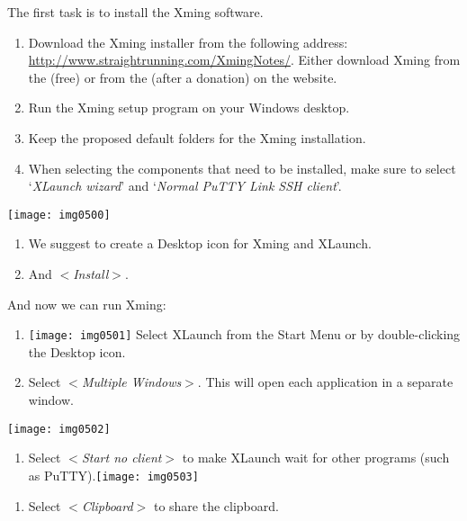 The first task is to install the Xming software.

\begin{enumerate}
  \item  Download the Xming installer from the following
    address: \url{http://www.straightrunning.com/XmingNotes/}. Either download Xming
    from the  (free) or from the  (after a donation) on the website.
  \item  Run the Xming setup program on your Windows desktop.
  \item  Keep the proposed default folders for the Xming installation.
  \item  When selecting the components that need to be installed, make sure to
    select `\emph{XLaunch wizard}' and `\emph{Normal PuTTY Link SSH client}'.
\end{enumerate}

\texttt{[image: img0500]}

\begin{enumerate}
\item  We suggest to create a Desktop icon for Xming and XLaunch.
\item  And $<$\textit{Install}$>$.
\end{enumerate}

And now we can run Xming:

\begin{enumerate}
\item  \texttt{[image: img0501]}  Select XLaunch from the Start Menu or by double-clicking the Desktop icon.
\item  Select $<$\textit{Multiple Windows}$>$. This will open each application in a separate window.
\end{enumerate}

\texttt{[image: img0502]}

\begin{enumerate}
\item  Select $<$\textit{Start no client}$>$ to make XLaunch wait for other programs (such as PuTTY).\texttt{[image: img0503]}
\end{enumerate}

\begin{enumerate}
\item  Select $<$\textit{Clipboard}$>$ to share the clipboard.
\end{enumerate}

